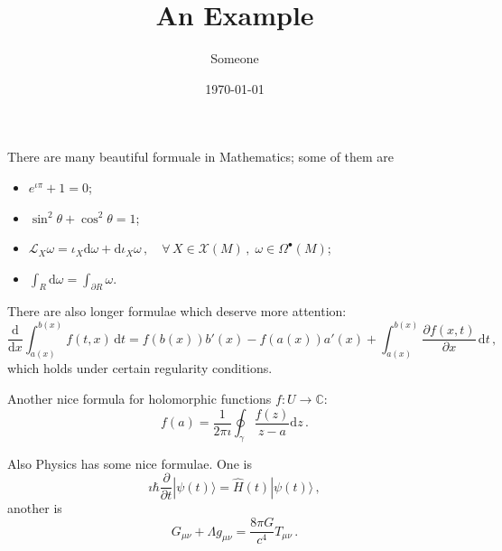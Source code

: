 \documentclass[a4paper]{article}
\title{An Example}
\author{Someone}
\date{\today}
\begin{document}
\maketitle

There are many beautiful formuale in Mathematics; some of them are
\begin{itemize}
    \item $e^{ιπ} + 1 = 0$;
    \item $\sin^2 θ + \cos^2 θ = 1$;
    \item $\mathcal{L}_X ω = ι_X\mathrm{d}ω + \mathrm{d}ι_X ω \,, \quad ∀\, X ∈ \mathcal{X}(M)\,,\; ω ∈ Ω^•(M)$;
    \item $∫_R \mathrm{d}ω = ∫_{∂R} ω$.
\end{itemize}

There are also longer formulae which deserve more attention:
$$
\frac{\mathrm{d}}{\mathrm{d}x} ∫_{a(x)}^{b(x)} f(t, x)\, \mathrm{d}t = f(b(x))b'(x) - f(a(x))a'(x) + ∫_{a(x)}^{b(x)}\frac{∂ f(x, t)}{∂ x}\, \mathrm{d}t\,,
$$
which holds under certain regularity conditions.

Another nice formula for holomorphic functions $f: U → \mathbb{C}$:
$$
f(a) = \frac{1}{2πı} ∮_γ \frac{f(z)}{z-a}\mathrm{d}z\,.
$$

Also Physics has some nice formulae. One is
$$
ıℏ\frac{∂}{∂t} |ψ(t)⟩ = \widehat{H}(t)|ψ(t)⟩ \,,
$$
another is
$$
G_{μν} + Λg_{μν} = \frac{8πG}{c^4}T_{μν}\,.
$$
\end{document}
